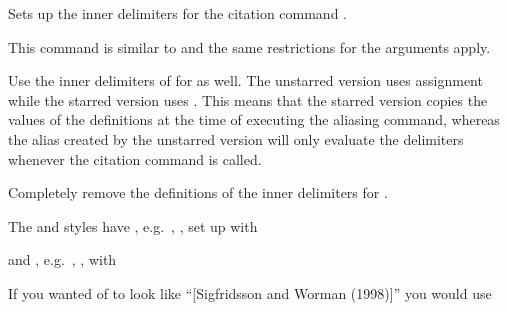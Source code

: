 \documentclass[DIV=9]{scrartcl}
\newcommand*{\highlightbf}[2][1]{\textcolor{highlight#1}{\textbf{#2}}}
\begin{document}
\begin{ltxsyntax}
Sets up the inner delimiters for the citation command
.

This command is similar to  and the same
restrictions for the arguments apply.


Use the inner delimiters of  for
 as well.
The unstarred version uses  assignment while the starred version uses
. This means that the starred version copies the values of the
definitions at the time of executing the aliasing command,
whereas the alias created by the unstarred version will only evaluate the
delimiters whenever the citation command is called.


Completely remove the definitions of the inner delimiters for
.

The  and  styles have ,
e.g.\ \parencite{knuth:ct:a}, \parencite{sigfridsson}, set up with
\begin{biblatexcode}
\end{biblatexcode}
and , e.g.\ \textcite{knuth:ct:a}, \textcite{sigfridsson}, with
\begin{biblatexcode}
\end{biblatexcode}
If you wanted  of  to look like
\enquote{[Sigfridsson and Worman (1998)]} you would use
\begin{biblatexcode}
\end{biblatexcode}
\citereset
\begin{bibexample}
\DeclareOuterCiteDelim{parencite}{\highlightbf[1]{\bibopenbracket}}{%
  \highlightbf[1]{\bibclosebracket}}
\DeclareInnerCiteDelim{parencite}{\highlightbf[2]{\bibopenparen}}{%
  \highlightbf[2]{\bibcloseparen}}
\parencite{sigfridsson}\quad\parencite{worman,geer}\quad
\parencite{knuth:ct:a,knuth:ct:b,knuth:ct:c}
\end{bibexample}
\end{ltxsyntax}
\end{document}
